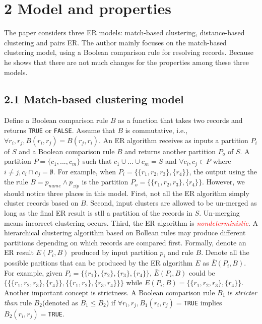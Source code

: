 \documentclass[12pt,a4paper]{report}
\begin{document}
\section*{2 Model and properties}
The paper considers three ER models: match-based clustering, distance-based clustering and pairs ER. The author mainly focuses on the match-based clustering model, using a Boolean comparison rule for resolving records. Because he shows that there are not much changes for the properties among these three models. 
\subsection*{2.1 Match-based clustering model}
Define a Boolean comparison rule $B$ as a function that takes two records and returns \texttt{TRUE} or \texttt{FALSE}. Assume that $B$ is commutative, i.e., $\forall r_{i}, r_{j}, B(r_{i}, r_{j})=B(r_{j}, r_{i})$. An ER algorithm receives as inputs a partition $P_{i}$ of $S$ and a Boolean comparison rule $B$ and returns another partition $P_{o}$ of $S$. A partition $P=\{c_{1},...,c_{m}\}$ such that $c_{1}\cup ...\cup c_{m}=S$ and $\forall c_{i},c_{j} \in P$ where $i \neq j, c_{i} \cap c_{j}=\emptyset$. For example, when $P_{i}=\{\{r_{1},r_{2},r_{3}\}, \{r_{4}\}\}$, the output using the the rule $B=p_{name}\wedge p_{zip}$ is the partition $P_{o}=\{\{r_{1},r_{2},r_{3}\}, \{r_{4}\}\}$. However, we should notice three places in this model. First, not all the ER algorithm simply cluster records based on $B$. Second, input clusters are allowed to be un-merged as long as the final ER result is stll a partition of the records in $S$. Un-merging means incorrect clustering occurs. Third, the ER algorithm is \textcolor{red}{\emph{nondeterministic}}. A hierarchical clustering algorithm based on Bollean rules may produce different partitions depending on which records are compared first. Formally, denote an ER result $E(P_{i},B)$ produced by input partition $p_{i}$ and rule $B$. Denote all the possible paritions that can be produced by the ER algorithm $E$ as $\bar{E}(P_{i},B)$. For example, given $P_{i}= \{\{r_{1}\}, \{r_{2}\}, \{r_{3}\}, \{r_{4}\}\}$, $\bar{E}(P_{i},B)$ could be $\{\{\{r_{1},r_{2},r_{3}\}, \{r_{4}\}\},\{\{r_{1},r_{2}\},\{r_{3},r_{4}\}\}\}$ while $E(P_{i},B)=\{\{r_{1},r_{2},r_{3}\}, \{r_{4}\}\}$. Another important concept is strictness. A Boolean comparison rule $B_{1}$ is \emph{stricter than} rule ${B_{2}}$(denoted as $B_{1}\leq B_{2}$) if $\forall r_{i}, r_{j}, B_{1}(r_{i}, r_{j})=$\texttt{TRUE} implies $B_{2}(r_{i},r_{j})=$\texttt{TRUE}. 
\end{document}
